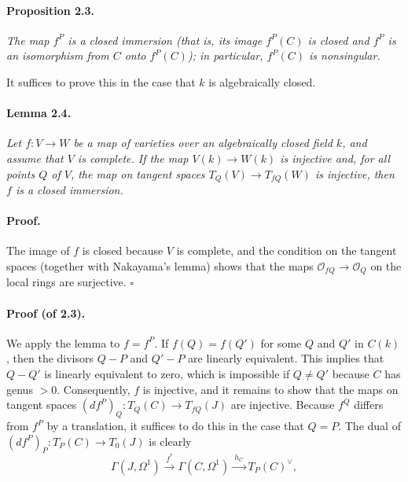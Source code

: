 \paragraph{Proposition 2.3.}
\textit{The map $f^P$ is a closed immersion (that is, its image $f^P(C)$ is
closed and $f^P$ is an isomorphism from $C$ onto $f^P(C)$); in particular,
$f^P(C)$ is nonsingular.}

It suffices to prove this in the case that $k$ is algebraically closed.

\paragraph{Lemma 2.4.}
\textit{Let $f \colon V \to W$ be a map of varieties over an algebraically
closed field $k$, and assume that $V$ is complete. If the map
$V(k) \to W(k)$ is injective and, for all points $Q$ of $V$, the map on
tangent spaces $T_Q(V) \to T_{fQ}(W)$ is injective, then $f$ is a closed
immersion.}

\paragraph{Proof.}
The image of $f$ is closed because $V$ is complete, and the condition on the
tangent spaces (together with Nakayama's lemma) shows that the maps
$\mathcal{O}_{fQ} \to \mathcal{O}_Q$ on the local rings are surjective.
\hfill $\square$

\paragraph{Proof (of 2.3).}
We apply the lemma to $f = f^P$. If $f(Q) = f(Q')$ for some $Q$ and $Q'$ in
$C(k)$, then the divisors $Q-P$ and $Q'-P$ are linearly equivalent. This
implies that $Q-Q'$ is linearly equivalent to zero, which is impossible if
$Q \ne Q'$ because $C$ has genus $> 0$. Consequently, $f$ is injective, and
it remains to show that the maps on tangent spaces
$(df^P)_Q \colon T_Q(C) \to T_{fQ}(J)$ are injective. Because $f^Q$ differs
from $f^P$ by a translation, it suffices to do this in the case that $Q=P$.
The dual of $(df^P)_P \colon T_P(C) \to T_0(J)$ is clearly
\[
  \Gamma(J, \Omega^1) \xrightarrow{\ f^*\ } \Gamma(C, \Omega^1)
  \xrightarrow{\ h_C\ } T_P(C)^\vee,
\]
